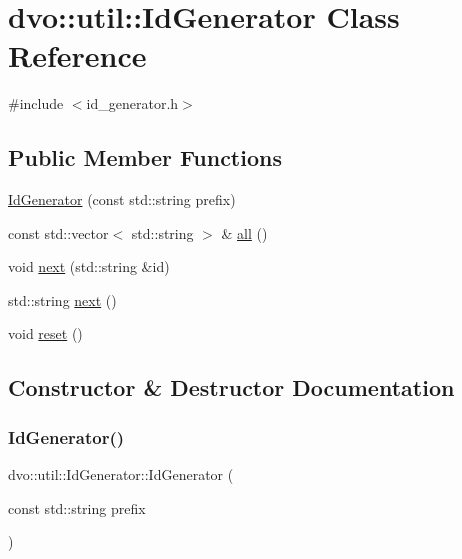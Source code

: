 \hypertarget{classdvo_1_1util_1_1_id_generator}{}\section{dvo\+:\+:util\+:\+:Id\+Generator Class Reference}
\label{classdvo_1_1util_1_1_id_generator}


{\ttfamily \#include $<$id\+\_\+generator.\+h$>$}

\subsection*{Public Member Functions}
\begin{DoxyCompactItemize}
\item 
\mbox{\hyperlink{classdvo_1_1util_1_1_id_generator_a35c99c2e1f27bd999b21c6379cc89bb0}{Id\+Generator}} (const std\+::string prefix)
\item 
const std\+::vector$<$ std\+::string $>$ \& \mbox{\hyperlink{classdvo_1_1util_1_1_id_generator_ae133a41182d995aa3a171cba652d4c8f}{all}} ()
\item 
void \mbox{\hyperlink{classdvo_1_1util_1_1_id_generator_aa97510b1d94e3124e66e752f624856dd}{next}} (std\+::string \&id)
\item 
std\+::string \mbox{\hyperlink{classdvo_1_1util_1_1_id_generator_ab28be3ac1715fc37d583de6bd75b6247}{next}} ()
\item 
void \mbox{\hyperlink{classdvo_1_1util_1_1_id_generator_a3b889077b94492fa69392c4a97ba1448}{reset}} ()
\end{DoxyCompactItemize}


\subsection{Constructor \& Destructor Documentation}
\mbox{\label{classdvo_1_1util_1_1_id_generator_a35c99c2e1f27bd999b21c6379cc89bb0}} 
\subsubsection{\texorpdfstring{Id\+Generator()}{IdGenerator()}}
{\footnotesize\ttfamily dvo\+::util\+::\+Id\+Generator\+::\+Id\+Generator (\begin{DoxyParamCaption}\item[{const std\+::string}]{prefix }\end{DoxyParamCaption})\hspace{0.3cm}{\ttfamily [inline]}}



